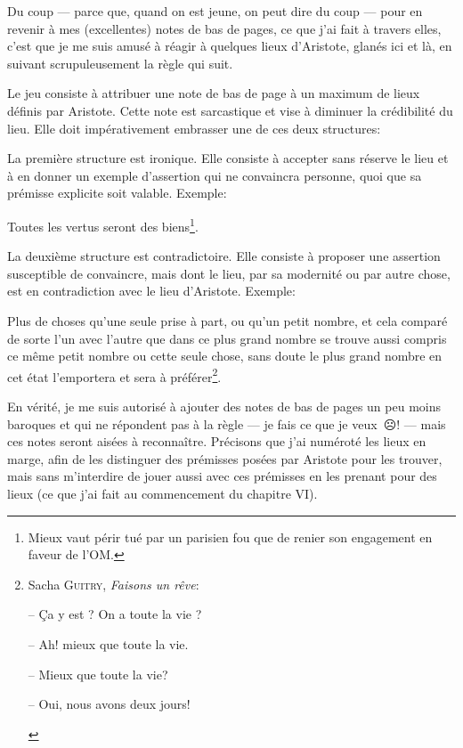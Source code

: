 Du coup --- parce que, quand on est jeune, on peut dire du coup --- pour en revenir à mes (excellentes) notes de bas
de pages, ce que j'ai fait à travers elles, c'est que je me suis amusé à réagir à quelques lieux d'Aristote, glanés
ici et là, en suivant scrupuleusement la règle qui suit.

\bigbreak

Le jeu consiste à attribuer une note de bas de page à un maximum de lieux définis par Aristote. Cette note est
sarcastique et vise à diminuer la crédibilité du lieu. Elle doit impérativement embrasser une de ces deux
structures:

La première structure est ironique. Elle consiste à accepter sans réserve le lieu et à en donner un exemple d'assertion
qui ne convaincra personne, quoi que sa prémisse explicite soit valable. Exemple:

\begin{lieu}
	Toutes les vertus seront des biens\footnote{Mieux vaut périr tué par un parisien fou que de renier son engagement
	en faveur de l'OM.}.
\end{lieu}

La deuxième structure est contradictoire. Elle consiste à proposer une assertion susceptible de convaincre, mais dont le
lieu, par sa modernité ou par autre chose, est en contradiction avec le lieu d'Aristote. Exemple:

\begin{lieu}
	Plus de choses qu'une seule prise à part, ou qu'un petit nombre, et cela comparé de sorte l'un avec l'autre
	que dans ce plus grand nombre se trouve aussi compris ce même petit nombre ou cette seule chose, sans doute le plus
	grand nombre en cet état l'emportera et sera à préférer\footnote{Sacha \textsc{Guitry}, \emph{Faisons un rêve}:
	\begin{emphpar}\normalfont
	-- Ça y est ? On a toute la vie ?

	-- Ah! mieux que toute la vie.

	-- Mieux que toute la vie?

	-- Oui, nous avons deux jours!
	\end{emphpar}}.
\end{lieu}

\newfontfamily{}

En vérité, je me suis autorisé à ajouter des notes de bas de pages un peu moins baroques et qui ne répondent pas à
la règle --- je fais ce que je veux~{\DejaSans ☹}! --- mais ces notes seront aisées à reconnaître. Précisons que j'ai
numéroté les lieux en marge, afin de les distinguer des prémisses posées par Aristote pour les trouver, mais sans
m'interdire de jouer aussi avec ces prémisses en les prenant pour des lieux (ce que j'ai fait au commencement du
chapitre VI).


